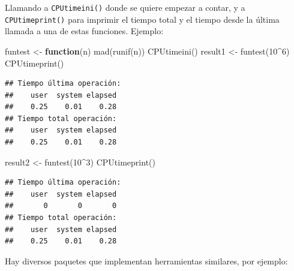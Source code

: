 \documentclass[
]{book}
\newenvironment{Shaded}{\begin{snugshade}}{\end{snugshade}}
\newcommand{\ControlFlowTok}[1]{\textcolor[rgb]{0.13,0.29,0.53}{\textbf{#1}}}
\newcommand{\DecValTok}[1]{\textcolor[rgb]{0.00,0.00,0.81}{#1}}
\newcommand{\FunctionTok}[1]{\textcolor[rgb]{0.00,0.00,0.00}{#1}}
\newcommand{\NormalTok}[1]{#1}
\newcommand{\OtherTok}[1]{\textcolor[rgb]{0.56,0.35,0.01}{#1}}
\newcommand{\SpecialCharTok}[1]{\textcolor[rgb]{0.00,0.00,0.00}{#1}}
\theoremstyle{break}
\theoremstyle{nonumberplain}
\begin{document}
Llamando a \texttt{CPUtimeini()} donde se quiere empezar a contar,
y a \texttt{CPUtimeprint()} para imprimir el tiempo total
y el tiempo desde la última llamada a una de estas funciones.
Ejemplo:

\begin{Shaded}
\begin{Highlighting}[]
\NormalTok{funtest }\OtherTok{\textless{}{-}} \ControlFlowTok{function}\NormalTok{(n) }\FunctionTok{mad}\NormalTok{(}\FunctionTok{runif}\NormalTok{(n)) }
\FunctionTok{CPUtimeini}\NormalTok{()}
\NormalTok{result1 }\OtherTok{\textless{}{-}} \FunctionTok{funtest}\NormalTok{(}\DecValTok{10}\SpecialCharTok{\^{}}\DecValTok{6}\NormalTok{)}
\FunctionTok{CPUtimeprint}\NormalTok{()}
\end{Highlighting}
\end{Shaded}

\begin{verbatim}
## Tiempo última operación:
##    user  system elapsed 
##    0.25    0.01    0.28 
## Tiempo total operación:
##    user  system elapsed 
##    0.25    0.01    0.28
\end{verbatim}

\begin{Shaded}
\begin{Highlighting}[]
\NormalTok{result2 }\OtherTok{\textless{}{-}} \FunctionTok{funtest}\NormalTok{(}\DecValTok{10}\SpecialCharTok{\^{}}\DecValTok{3}\NormalTok{)}
\FunctionTok{CPUtimeprint}\NormalTok{()}
\end{Highlighting}
\end{Shaded}

\begin{verbatim}
## Tiempo última operación:
##    user  system elapsed 
##       0       0       0 
## Tiempo total operación:
##    user  system elapsed 
##    0.25    0.01    0.28
\end{verbatim}

Hay diversos paquetes que implementan herramientas similares, por ejemplo:
\end{document}
